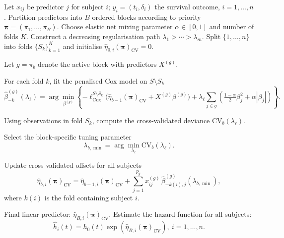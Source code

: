 \documentclass{standalone}
\begin{document}
\nopagecolor
\begin{algorithm}[H]
\begin{algorithmic}[1]

\STATE Let $x_{ij}$ be predictor $j$ for subject $i$; $y_i=(t_i,\delta_i)$ the survival outcome, $i=1,\ldots,n$.
\STATE Partition predictors into $B$ ordered blocks according to priority $\bm{\pi}=(\pi_1,\dots,\pi_B)$.
\STATE Choose elastic net mixing parameter $\alpha\in[0,1]$ and number of folds $K$.
\STATE Construct a decreasing regularisation path $\lambda_1>\cdots>\lambda_m$.
\STATE Split $\{1,\ldots,n\}$ into folds $\{S_k\}_{k=1}^K$ and initialise $\hat{\eta}_{0,i}(\bm{\pi})_{\mathrm{CV}}=0$.

    \STATE Let $g=\pi_b$ denote the active block with predictors $X^{(g)}$.

        \STATE For each fold $k$, fit the penalised Cox model on $S\setminus S_k$
        \[
        \hat{\beta}^{(g)}_{-k}(\lambda_\ell)
        =
        \arg\min_{\beta^{(g)}}
        \left\{
        -\ell_{\mathrm{Cox}}^{S\setminus S_k}\!\big(\hat{\eta}_{b-1}(\bm{\pi})_{\mathrm{CV}} + X^{(g)}\beta^{(g)}\big)
        +
        \lambda_\ell \sum_{j\in g}\!\left(\tfrac{1-\alpha}{2}\beta_j^2+\alpha|\beta_j|\right)
        \right\}.
        \]

        \STATE Using observations in fold $S_k$, compute the cross-validated deviance $\mathrm{CV}_b(\lambda_\ell)$.
    \ENDFOR

    \STATE Select the block-specific tuning parameter
    \[
    \lambda_{b,\min}=\arg\min_{\lambda_\ell}\mathrm{CV}_b(\lambda_\ell).
    \]

    \STATE Update cross-validated offsets for all subjects
    \[
    \hat{\eta}_{b,i}(\bm{\pi})_{\mathrm{CV}}
    =
    \hat{\eta}_{b-1,i}(\bm{\pi})_{\mathrm{CV}}
    +
    \sum_{j=1}^{p_g} x^{(g)}_{ij}\,\hat{\beta}^{(g)}_{-k(i),j}(\lambda_{b,\min}),
    \]
    where $k(i)$ is the fold containing subject $i$.
\ENDFOR

\STATE Final linear predictor: $\hat{\eta}_{B,i}(\bm{\pi})_{\mathrm{CV}}$.
\STATE Estimate the hazard function for all subjects:
\[
\hat{h}_i(t)=h_0(t)\exp\!\left(\hat{\eta}_{B,i}(\bm{\pi})_{\mathrm{CV}}\right), \ i=1,\ldots, n.
\]

\end{algorithmic}
\end{algorithm}
\end{document}
